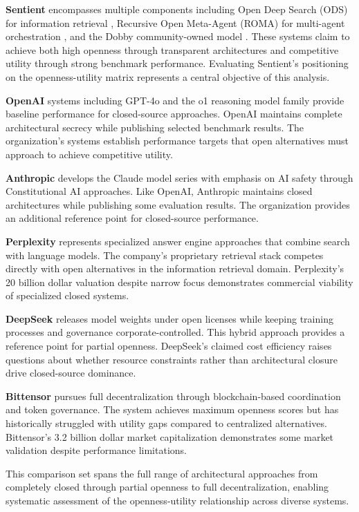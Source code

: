 \textbf{Sentient} encompasses multiple components including Open Deep Search (ODS) for information retrieval \cite{ods2025}, Recursive Open Meta-Agent (ROMA) for multi-agent orchestration \cite{roma2025}, and the Dobby community-owned model \cite{dobby2025}. These systems claim to achieve both high openness through transparent architectures and competitive utility through strong benchmark performance. Evaluating Sentient's positioning on the openness-utility matrix represents a central objective of this analysis.

\textbf{OpenAI} systems including GPT-4o and the o1 reasoning model family provide baseline performance for closed-source approaches. OpenAI maintains complete architectural secrecy while publishing selected benchmark results. The organization's systems establish performance targets that open alternatives must approach to achieve competitive utility.

\textbf{Anthropic} develops the Claude model series with emphasis on AI safety through Constitutional AI approaches. Like OpenAI, Anthropic maintains closed architectures while publishing some evaluation results. The organization provides an additional reference point for closed-source performance.

\textbf{Perplexity} represents specialized answer engine approaches that combine search with language models. The company's proprietary retrieval stack competes directly with open alternatives in the information retrieval domain. Perplexity's 20 billion dollar valuation \cite{perplexity2025} despite narrow focus demonstrates commercial viability of specialized closed systems.

\textbf{DeepSeek} releases model weights under open licenses while keeping training processes and governance corporate-controlled. This hybrid approach provides a reference point for partial openness. DeepSeek's claimed cost efficiency \cite{deepseek_wikipedia2025} raises questions about whether resource constraints rather than architectural closure drive closed-source dominance.

\textbf{Bittensor} pursues full decentralization through blockchain-based coordination and token governance. The system achieves maximum openness scores but has historically struggled with utility gaps compared to centralized alternatives. Bittensor's 3.2 billion dollar market capitalization \cite{bittensor_cmc2025} demonstrates some market validation despite performance limitations.

This comparison set spans the full range of architectural approaches from completely closed through partial openness to full decentralization, enabling systematic assessment of the openness-utility relationship across diverse systems.

